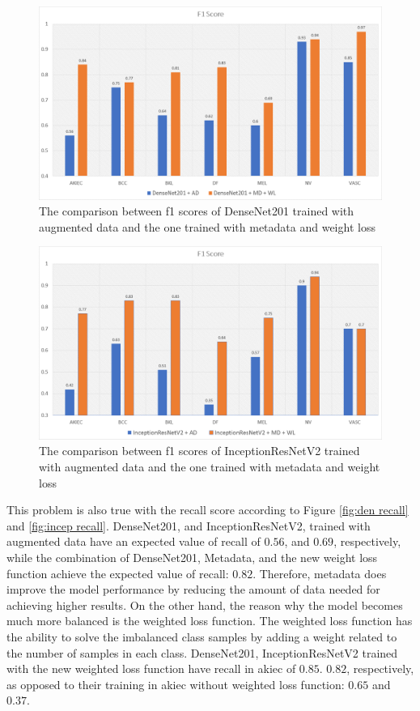 \documentclass[sensors,article,submit,pdftex,moreauthors]{Definitions/mdpi}
\begin{document}
	\begin{figure}[H]
		\centering
		\includegraphics[width=1\linewidth]{Definitions/den f1}
		\caption{The comparison between f1 scores of DenseNet201 trained with augmented data and the one trained with metadata and weight loss}
		\label{fig:den f1}
	\end{figure}
	\begin{figure}[H]
		\centering
		\includegraphics[width=1\linewidth]{Definitions/in f1}
		\caption{The comparison between f1 scores of InceptionResNetV2 trained with augmented data and the one trained with metadata and weight loss}
		\label{fig:incep f1}
	\end{figure}
	
	This problem is also true with the recall score according to Figure \ref{fig:den recall} and \ref{fig:incep recall}. DenseNet201, and InceptionResNetV2, trained with augmented data have an expected value of recall of $0.56$, and $0.69$, respectively, while the combination of DenseNet201, Metadata, and the new weight loss function achieve the expected value of recall: $0.82$. Therefore, metadata does improve the model performance by reducing the amount of data needed for achieving higher results. On the other hand, the reason why the model becomes much more balanced is the weighted loss function. The weighted loss function has the ability to solve the imbalanced class samples by adding a weight related to the number of samples in each class. DenseNet201, InceptionResNetV2 trained with the new weighted loss function have recall in akiec of $0.85$. $0.82$, respectively, as opposed to their training in akiec without weighted loss function: $0.65$ and $0.37$. 
	
\end{document}
